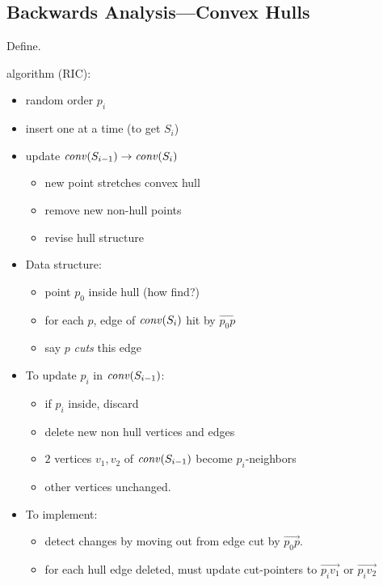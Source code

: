 \documentclass{article}
\begin{document}
\subsection*{Backwards Analysis---Convex Hulls}

Define.

algorithm (RIC):
\begin{itemize}
\item random order $p_i$
\item insert one at a time (to get $S_i$)
\item update $\mathit{conv}(S_{i-1})\rightarrow \mathit{conv}(S_i)$
  \begin{itemize}
  \item new point stretches convex hull
  \item remove new non-hull points
  \item revise hull structure
  \end{itemize}
\item Data structure:
  \begin{itemize}
  \item point $p_0$ inside hull (how find?)
  \item for each $p$, edge of $\mathit{conv}(S_i)$ hit by $\vec{p_0p}$
  \item say $p$ \emph{cuts} this edge
  \end{itemize}
\item To update $p_i$ in $\mathit{conv}(S_{i-1})$:
  \begin{itemize}
  \item if $p_i$ inside, discard
  \item delete new non hull vertices and edges
  \item $2$ vertices $v_1,v_2$ of $\mathit{conv}(S_{i-1})$ become $p_i$-neighbors
  \item other vertices unchanged.
  \end{itemize}
\item To implement:
  \begin{itemize}
  \item detect changes by moving out from edge cut by $\vec{p_0 p}$.
  \item for each hull edge deleted, must update cut-pointers to
    $\vec{p_iv_1}$ or $\vec{p_iv_2}$
  \end{itemize}
\end{itemize}
\end{document}
